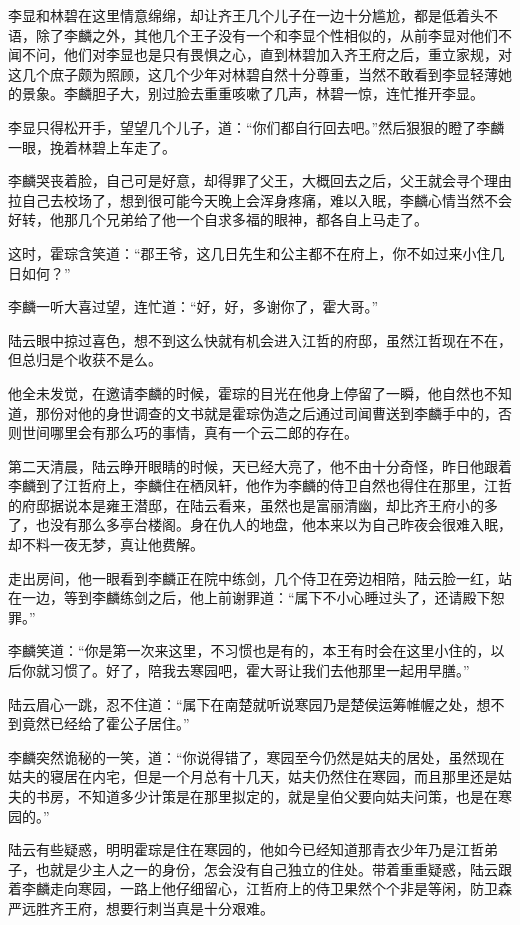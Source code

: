 李显和林碧在这里情意绵绵，却让齐王几个儿子在一边十分尴尬，都是低着头不语，除了李麟之外，其他几个王子没有一个和李显个性相似的，从前李显对他们不闻不问，他们对李显也是只有畏惧之心，直到林碧加入齐王府之后，重立家规，对这几个庶子颇为照顾，这几个少年对林碧自然十分尊重，当然不敢看到李显轻薄她的景象。李麟胆子大，别过脸去重重咳嗽了几声，林碧一惊，连忙推开李显。

李显只得松开手，望望几个儿子，道：“你们都自行回去吧。”然后狠狠的瞪了李麟一眼，挽着林碧上车走了。

李麟哭丧着脸，自己可是好意，却得罪了父王，大概回去之后，父王就会寻个理由拉自己去校场了，想到很可能今天晚上会浑身疼痛，难以入眠，李麟心情当然不会好转，他那几个兄弟给了他一个自求多福的眼神，都各自上马走了。

这时，霍琮含笑道：“郡王爷，这几日先生和公主都不在府上，你不如过来小住几日如何？”

李麟一听大喜过望，连忙道：“好，好，多谢你了，霍大哥。”

陆云眼中掠过喜色，想不到这么快就有机会进入江哲的府邸，虽然江哲现在不在，但总归是个收获不是么。

他全未发觉，在邀请李麟的时候，霍琮的目光在他身上停留了一瞬，他自然也不知道，那份对他的身世调查的文书就是霍琮伪造之后通过司闻曹送到李麟手中的，否则世间哪里会有那么巧的事情，真有一个云二郎的存在。

第二天清晨，陆云睁开眼睛的时候，天已经大亮了，他不由十分奇怪，昨日他跟着李麟到了江哲府上，李麟住在栖凤轩，他作为李麟的侍卫自然也得住在那里，江哲的府邸据说本是雍王潜邸，在陆云看来，虽然也是富丽清幽，却比齐王府小的多了，也没有那么多亭台楼阁。身在仇人的地盘，他本来以为自己昨夜会很难入眠，却不料一夜无梦，真让他费解。

走出房间，他一眼看到李麟正在院中练剑，几个侍卫在旁边相陪，陆云脸一红，站在一边，等到李麟练剑之后，他上前谢罪道：“属下不小心睡过头了，还请殿下恕罪。”

李麟笑道：“你是第一次来这里，不习惯也是有的，本王有时会在这里小住的，以后你就习惯了。好了，陪我去寒园吧，霍大哥让我们去他那里一起用早膳。”

陆云眉心一跳，忍不住道：“属下在南楚就听说寒园乃是楚侯运筹帷幄之处，想不到竟然已经给了霍公子居住。”

李麟突然诡秘的一笑，道：“你说得错了，寒园至今仍然是姑夫的居处，虽然现在姑夫的寝居在内宅，但是一个月总有十几天，姑夫仍然住在寒园，而且那里还是姑夫的书房，不知道多少计策是在那里拟定的，就是皇伯父要向姑夫问策，也是在寒园的。”

陆云有些疑惑，明明霍琮是住在寒园的，他如今已经知道那青衣少年乃是江哲弟子，也就是少主人之一的身份，怎会没有自己独立的住处。带着重重疑惑，陆云跟着李麟走向寒园，一路上他仔细留心，江哲府上的侍卫果然个个非是等闲，防卫森严远胜齐王府，想要行刺当真是十分艰难。

